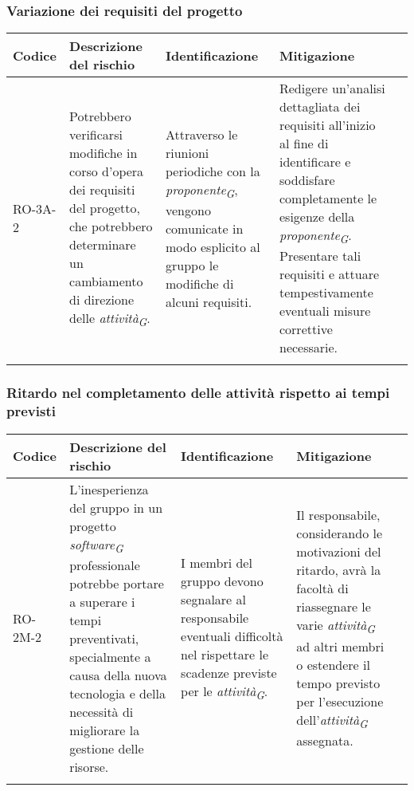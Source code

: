 \subsubsection{Variazione dei requisiti del progetto}
\begin{table}[ht]
    \centering
    \begin{tabularx}{\textwidth}{l>{\RaggedRight}X>{\RaggedRight}X>{\RaggedRight}X>{\RaggedRight}X}
    \toprule
    \rowcolor{gray!50}
    \textbf{Codice} & \textbf{Descrizione del rischio} & \textbf{Identificazione} & \textbf{Mitigazione} \\
    \midrule
    \addlinespace 
    RO-3A-2 & 
    Potrebbero verificarsi modifiche in corso d'opera dei requisiti del progetto, che potrebbero determinare un cambiamento di direzione delle \textit{attività}\textsubscript{\textit{G}}. &
    Attraverso le riunioni periodiche con la \textit{proponente}\textsubscript{\textit{G}}, vengono comunicate in modo esplicito al gruppo le modifiche di alcuni requisiti. &
    Redigere un'analisi dettagliata dei requisiti all'inizio al fine di identificare e soddisfare completamente le esigenze della \textit{proponente}\textsubscript{\textit{G}}. Presentare tali requisiti e attuare tempestivamente eventuali misure correttive necessarie.\\
    \bottomrule
    \addlinespace 
    \end{tabularx}
\end{table}

\newpage
\subsubsection{Ritardo nel completamento delle attività rispetto ai tempi previsti}
\begin{table}[ht]
    \centering
    \begin{tabularx}{\textwidth}{l>{\RaggedRight}X>{\RaggedRight}X>{\RaggedRight}X>{\RaggedRight}X}
    \toprule
    \rowcolor{gray!50}
    \textbf{Codice} & \textbf{Descrizione del rischio} & \textbf{Identificazione} & \textbf{Mitigazione}\\
    \midrule
    \addlinespace 
    RO-2M-2 & 
    L'inesperienza del gruppo in un progetto \textit{software}\textsubscript{\textit{G}} professionale potrebbe portare a superare i tempi preventivati, specialmente a causa della nuova tecnologia e della necessità di migliorare la gestione delle risorse.& 
    I membri del gruppo devono segnalare al responsabile eventuali difficoltà nel rispettare le scadenze previste per le \textit{attività}\textsubscript{\textit{G}}.&
    Il responsabile, considerando le motivazioni del ritardo, avrà la facoltà di riassegnare le varie \textit{attività}\textsubscript{\textit{G}} ad altri membri o estendere il tempo previsto per l'esecuzione dell'\textit{attività}\textsubscript{\textit{G}} assegnata.\\
    \bottomrule
    \addlinespace 
    \end{tabularx}
\end{table}

